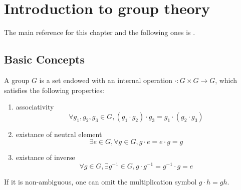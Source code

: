 \chapter{Introduction to group theory}
The main reference for this chapter and the following ones is \cite{Tung1985}.


\section{Basic Concepts}

\begin{definition}[Group]
    A group $G$ is a set endowed with an internal operation $\cdot: G \times G \rightarrow G$, which satisfies the following properties:
    \begin{enumerate}
        \item associativity
        \begin{equation}
            \forall g_1, g_2, g_3 \in G, (g_1 \cdot g_2) \cdot g_3 = g_1 \cdot (g_2 \cdot g_3)
            \label{eq:group_associativity}
        \end{equation}
        \item existance of neutral element
        \begin{equation}
            \exists e \in G, \forall g \in G, g\cdot e = e\cdot g = g
            \label{eq:group_neutral}
        \end{equation}
        \item existance of inverse
        \begin{equation}
            \forall g \in G, \exists g^{-1} \in G, g \cdot g^{-1} = g^{-1} \cdot g = e
            \label{eq:group_inverse}
        \end{equation}
    \end{enumerate}
\end{definition}
If it is non-ambiguous, one can omit the multiplication symbol $g \cdot h = gh$.

